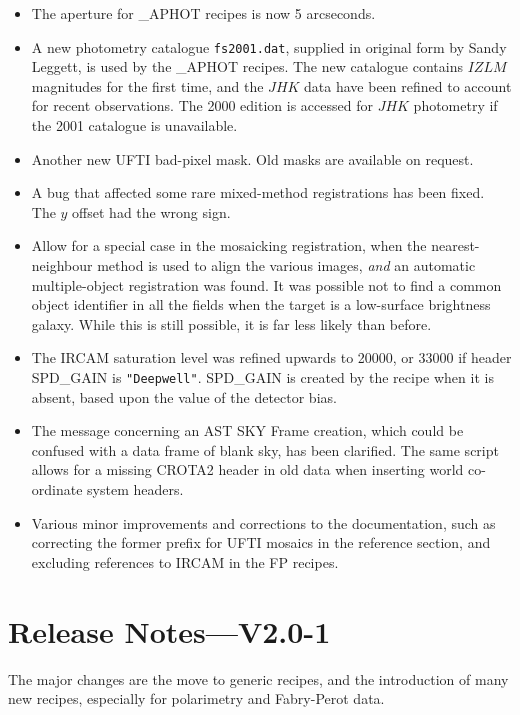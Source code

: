 \documentclass[twoside,11pt,nolof]{starlink}
\begin{document}
\begin{itemize}
   \item The aperture for \_APHOT recipes is now 5 arcseconds.
   \item A new photometry catalogue \texttt{fs2001.dat}, supplied in
      original form by Sandy Leggett, is used by the \_APHOT recipes.
      The new catalogue contains $IZLM$ magnitudes for the first time,
      and the $JHK$ data have been refined to account for recent
      observations.  The 2000 edition is accessed for $JHK$ photometry
      if the 2001 catalogue is unavailable.
   \item Another new UFTI bad-pixel mask.  Old masks are available on
      request.
   \item A bug that affected some rare mixed-method registrations has
      been fixed.  The $y$ offset had the wrong sign.
   \item Allow for a special case in the mosaicking registration, when
      the nearest-neighbour method is used to align the various images,
      \emph{{and}} an automatic multiple-object registration was found.
      It was possible not to find a common object identifier in all
      the fields when the target is a low-surface brightness galaxy.
      While this is still possible, it is far less likely than before.
   \item The IRCAM saturation level was refined upwards to 20000, or
      33000 if header SPD\_GAIN is {\tt{"Deepwell"}}.  SPD\_GAIN
      is created by the recipe when it is absent, based upon the value
      of the detector bias.
   \item The message concerning an AST SKY Frame creation,
      which could be confused with a data frame of blank sky, has been
      clarified.  The same script allows for a missing CROTA2 header
      in old data when inserting world co-ordinate system headers.
   \item Various minor improvements and corrections to the
      documentation, such as correcting the former prefix for UFTI
      mosaics in the reference section, and excluding references to
      IRCAM in the FP recipes.
\end{itemize}


\section{Release Notes---V2.0-1\label{se_changes2p0}}

The major changes are the move to generic recipes, and the introduction
of many new recipes, especially for polarimetry and Fabry-Perot data.
\end{document}
